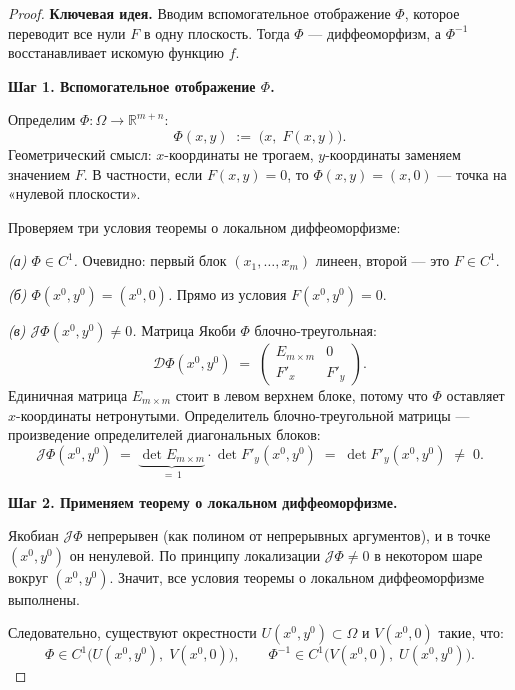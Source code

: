 \begin{proof}
  \textbf{Ключевая идея.}
  Вводим вспомогательное отображение $\Phi$, которое переводит
  все нули $F$ в одну плоскость. Тогда $\Phi$ --- диффеоморфизм,
  а $\Phi^{-1}$ восстанавливает искомую функцию $f$.

  \bigskip
  \textbf{Шаг 1. Вспомогательное отображение $\Phi$.}

  Определим $\Phi : \Omega \to \mathbb{R}^{m+n}$:
  \[
    \Phi(x, y) \;:=\; \bigl(x,\; F(x,y)\bigr).
  \]
  Геометрический смысл: $x$-координаты не трогаем, $y$-координаты
  заменяем значением $F$. В частности, если $F(x,y) = 0$, то
  $\Phi(x,y) = (x, 0)$ --- точка на «нулевой плоскости».

  Проверяем три условия теоремы о локальном диффеоморфизме:

  \medskip
  \textit{(а) $\Phi \in C^1$.}
  Очевидно: первый блок $(x_1, \ldots, x_m)$ линеен, второй --- это $F \in C^1$.

  \medskip
  \textit{(б) $\Phi(x^0, y^0) = (x^0, 0)$.}
  Прямо из условия $F(x^0, y^0) = 0$.

  \medskip
  \textit{(в) $\mathcal{J}\Phi(x^0, y^0) \neq 0$.}
  Матрица Якоби $\Phi$ блочно-треугольная:
  \[
    \mathcal{D}\Phi(x^0, y^0)
    \;=\;
    \begin{pmatrix}
      E_{m \times m} & 0 \\[4pt]
      F'_x & F'_y
    \end{pmatrix}.
  \]
  Единичная матрица $E_{m\times m}$ стоит в левом верхнем блоке,
  потому что $\Phi$ оставляет $x$-координаты нетронутыми.
  Определитель блочно-треугольной матрицы --- произведение
  определителей диагональных блоков:
  \[
    \mathcal{J}\Phi(x^0, y^0)
    \;=\; \underbrace{\det E_{m\times m}}_{=\,1}
          \cdot \det F'_y(x^0, y^0)
    \;=\; \det F'_y(x^0, y^0) \;\neq\; 0.
  \]

  \bigskip
  \textbf{Шаг 2. Применяем теорему о локальном диффеоморфизме.}

  Якобиан $\mathcal{J}\Phi$ непрерывен (как полином от непрерывных
  аргументов), и в точке $(x^0, y^0)$ он ненулевой. По принципу
  локализации $\mathcal{J}\Phi \neq 0$ в некотором шаре вокруг $(x^0,y^0)$.
  Значит, все условия теоремы о локальном диффеоморфизме выполнены.

  Следовательно, существуют окрестности $U(x^0, y^0) \subset \Omega$
  и $V(x^0, 0)$ такие, что:
  \[
    \Phi \in C^1\!\bigl(U(x^0,y^0),\; V(x^0,0)\bigr),
    \qquad
    \Phi^{-1} \in C^1\!\bigl(V(x^0,0),\; U(x^0,y^0)\bigr).
  \]


\end{proof}
